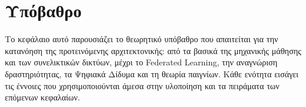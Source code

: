 
\chapter{Υπόβαθρο}
\label{ch:background}

Το κεφάλαιο αυτό παρουσιάζει το θεωρητικό υπόβαθρο που απαιτείται για την κατανόηση της προτεινόμενης αρχιτεκτονικής: από τα βασικά της μηχανικής μάθησης και των συνελικτικών δικτύων, μέχρι το Federated Learning, την αναγνώριση δραστηριότητας, τα Ψηφιακά Δίδυμα και τη θεωρία παιγνίων. Κάθε ενότητα εισάγει τις έννοιες που χρησιμοποιούνται άμεσα στην υλοποίηση και τα πειράματα των επόμενων κεφαλαίων.







